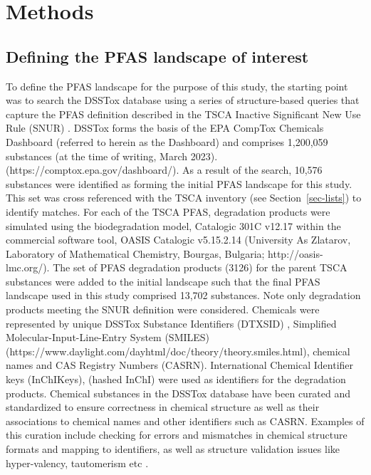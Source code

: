 \documentclass[
  super,
  preprint,
  3p]{elsarticle}
\begin{document}
\hypertarget{methods}{%
\section{Methods}\label{methods}}

\hypertarget{sec-defining-pfas}{%
\subsection{Defining the PFAS landscape of
interest}\label{sec-defining-pfas}}

To define the PFAS landscape for the purpose of this study, the starting
point was to search the DSSTox database
\citep{grulke_epas_2019, williams_comptox_2017} using a series of
structure-based queries that capture the PFAS definition described in
the TSCA Inactive Significant New Use Rule (SNUR) \citep{epa_2023}.
DSSTox forms the basis of the EPA CompTox Chemicals Dashboard (referred
to herein as the Dashboard)
\citep{grulke_epas_2019, williams_comptox_2017} and comprises 1,200,059
substances (at the time of writing, March 2023).
(https://comptox.epa.gov/dashboard/). As a result of the search, 10,576
substances were identified as forming the initial PFAS landscape for
this study. This set was cross referenced with the TSCA inventory (see
Section~\ref{sec-lists}) to identify matches. For each of the TSCA PFAS,
degradation products were simulated using the biodegradation model,
Catalogic 301C v12.17 within the commercial software tool, OASIS
Catalogic v5.15.2.14 (University As Zlatarov, Laboratory of Mathematical
Chemistry, Bourgas, Bulgaria; http://oasis-lmc.org/). The set of PFAS
degradation products (3126) for the parent TSCA substances were added to
the initial landscape such that the final PFAS landscape used in this
study comprised 13,702 substances. Note only degradation products
meeting the SNUR definition were considered. Chemicals were represented
by unique DSSTox Substance Identifiers (DTXSID)
\citep{grulke_epas_2019}, Simplified Molecular-Input-Line-Entry System
(SMILES)
(https://www.daylight.com/dayhtml/doc/theory/theory.smiles.html),
chemical names and CAS Registry Numbers (CASRN). International Chemical
Identifier keys (InChIKeys), (hashed InChI) \citep{heller_inchi_2015}
were used as identifiers for the degradation products. Chemical
substances in the DSSTox database have been curated and standardized to
ensure correctness in chemical structure as well as their associations
to chemical names and other identifiers such as CASRN. Examples of this
curation include checking for errors and mismatches in chemical
structure formats and mapping to identifiers, as well as structure
validation issues like hyper-valency, tautomerism etc
\citep{grulke_epas_2019}.
\end{document}
